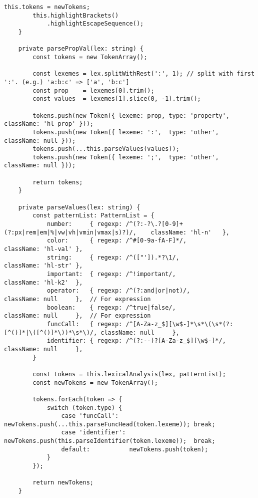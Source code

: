 \documentclass[autodetect-engine,dvi=dvipdfmx,ja=standard,
               a4j,11pt]{bxjsarticle}
\begin{document}
\begin{lstlisting}[caption={CSS/SCSSハイライタ({\tt scss.ts})(1)}, label={prog:scss1}]
        this.tokens = newTokens;
        this.highlightBrackets()
            .highlightEscapeSequence();
    }

    private parsePropVal(lex: string) {
        const tokens = new TokenArray();

        const lexemes = lex.splitWithRest(':', 1); // split with first ':'. (e.g.) 'a:b:c' => ['a', 'b:c']
        const prop    = lexemes[0].trim();
        const values  = lexemes[1].slice(0, -1).trim();

        tokens.push(new Token({ lexeme: prop, type: 'property', className: 'hl-prop' }));
        tokens.push(new Token({ lexeme: ':',  type: 'other',    className: null }));
        tokens.push(...this.parseValues(values));
        tokens.push(new Token({ lexeme: ';',  type: 'other',    className: null }));
        
        return tokens;
    }

    private parseValues(lex: string) {
        const patternList: PatternList = {
            number:     { regexp: /^(?:-?\.?[0-9]+(?:px|rem|em|%|vw|vh|vmin|vmax|s)?)/,    className: 'hl-n'   },
            color:      { regexp: /^#[0-9a-fA-F]*/,                                        className: 'hl-val' },
            string:     { regexp: /^(["']).*?\1/,                                          className: 'hl-str' },
            important:  { regexp: /^!important/,                                           className: 'hl-k2'  },
            operator:   { regexp: /^(?:and|or|not)/,                                       className: null     },  // For expression
            boolean:    { regexp: /^true|false/,                                           className: null     },  // For expression
            funcCall:   { regexp: /^[A-Za-z_$][\w$-]*\s*\(\s*(?:[^()]*|\([^()]*\))*\s*\)/, className: null     },
            identifier: { regexp: /^(?:--)?[A-Za-z_$][\w$-]*/,                             className: null     },
        }
    
        const tokens = this.lexicalAnalysis(lex, patternList);
        const newTokens = new TokenArray();
    
        tokens.forEach(token => {
            switch (token.type) {
                case 'funcCall':   newTokens.push(...this.parseFuncHead(token.lexeme)); break;
                case 'identifier': newTokens.push(this.parseIdentifier(token.lexeme));  break;
                default:           newTokens.push(token);
            }
        });
        
        return newTokens;
    }


\end{lstlisting}
\end{document}
